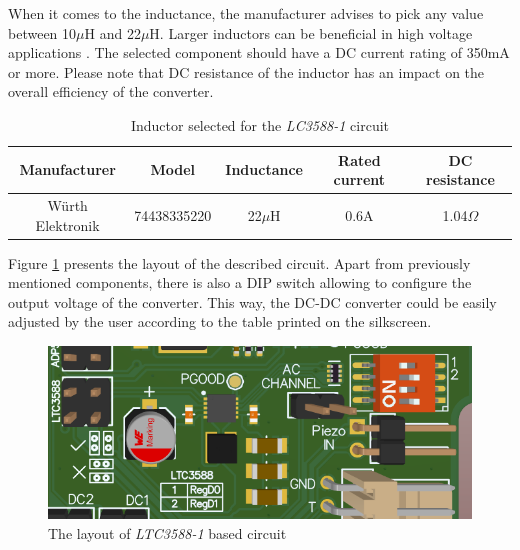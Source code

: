 \documentclass[12pt,a4paper]{article}
\begin{document}
When it comes to the inductance, the manufacturer advises to pick any value between 10$\mu$H and 22$\mu$H. Larger inductors can be beneficial in high voltage applications \cite{ltc3588_params}. The selected component should have a DC current rating of 350mA or more. Please note that DC resistance of the inductor has an impact on the overall efficiency of the converter.

\begin{table}[ht!]
\begin{tabular}{|c|c|c|c|c|}
\hline
\textbf{Manufacturer} & \textbf{Model} & \textbf{Inductance} & \textbf{Rated current} & \textbf{DC resistance}	\\ \hline
 Würth Elektronik & 74438335220 & 22$\mu$H & 0.6A & 1.04$\Omega$      \\ \hline

\end{tabular}
\caption{Inductor selected for the \textit{LC3588-1} circuit \cite{ltc3588_inductor_params}}
\label{tab:ltc3588_inductor}
\end{table}

\par

Figure \ref{fig:ltc3588layout} presents the layout of the described circuit. Apart from previously mentioned components, there is also a DIP switch allowing to configure the output voltage of the converter. This way, the DC-DC converter could be easily adjusted by the user according to the table printed on the silkscreen.

\begin{figure}[ht!]
\includegraphics[scale=0.8]{ltc3588_layout.png}
\caption{The layout of \textit{LTC3588-1} based circuit}
\label{fig:ltc3588layout}
\end{figure}
\end{document}
